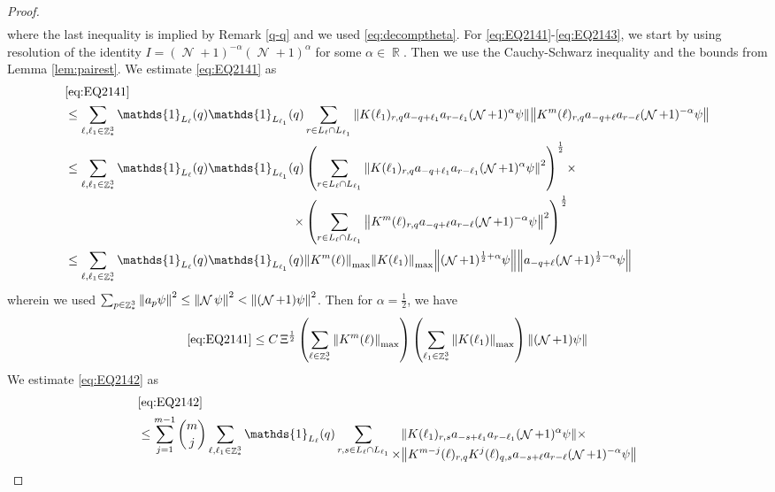 \documentclass[sn-mathphys, Numbered ,a4paper]{sn-jnl}%
\DeclareMathOperator{\R}{\mathbb{R}}
\DeclareMathOperator{\Z}{\mathbb{Z}}
\DeclareMathOperator{\NN}{\mathcal{N}}
\newcommand{\half}{\frac{1}{2}}
\theoremstyle{plain}
\theoremstyle{definition}
\theoremstyle{remark}
\theoremstyle{plain}
\theoremstyle{definition}
\theoremstyle{remark}
\begin{document}
{\begin{proof}
\begin{align}
	\end{align}
	where the last inequality is implied by Remark \ref{q-q} and we used \eqref{eq:decomptheta}.
	For \eqref{eq:EQ2141}-\eqref{eq:EQ2143}, we start by using resolution of the identity $I = (\NN+1)^{-\alpha}(\NN+1)^{\alpha}$ for some $\alpha \in \R$. Then we use the Cauchy-Schwarz inequality and the bounds from Lemma \ref{lem:pairest}.
	We estimate \eqref{eq:EQ2141} as 
	\begin{align}
		&\eqref{eq:EQ2141}\nonumber\\
		&\leq \sum\limits_{\ell, \ell_1\in \Z^3_*} \mathds{1}_{L_{\ell}}(q) \mathds{1}_{L_{\ell_1}}(q) \sum\limits_{r\in L_{\ell} \cap L_{\ell_1}} \norm{ K(\ell_1)_{r,q} a_{-q+\ell_1} a_{r-\ell_1}(\NN+1)^{\alpha}\psi}\norm{ K^m(\ell)_{r,q} a_{-q+\ell}a_{r-\ell} (\NN+1)^{-\alpha} \psi }\nonumber\\
		&\leq \sum\limits_{\ell, \ell_1\in \Z^3_*} \mathds{1}_{L_{\ell}}(q) \begin{aligned}[t] \mathds{1}_{L_{\ell_1}}(q) &\left(\sum\limits_{r\in L_{\ell} \cap L_{\ell_1}} \norm{ K(\ell_1)_{r,q} a_{-q+\ell_1} a_{r-\ell_1}(\NN+1)^{\alpha}\psi}^2\right)^\half \times \nonumber\\ \times &\left(\sum\limits_{r\in L_{\ell} \cap L_{\ell_1}} \norm{ K^m(\ell)_{r,q} a_{-q+\ell}a_{r-\ell} (\NN+1)^{-\alpha} \psi }^2\right)^\half \end{aligned}\nonumber\\
		&\leq \sum\limits_{\ell, \ell_1\in \Z^3_*} \mathds{1}_{L_{\ell}}(q) \mathds{1}_{L_{\ell_1}}(q)  \norm{K^m(\ell)}_{\mathrm{max}} \norm{ K(\ell_1)}_{\mathrm{max}} \norm{ (\NN+1)^{\half+\alpha} \psi} \norm{  a_{-q+\ell} (\NN+1)^{\half-\alpha} \psi }\nonumber
	\end{align} 
	wherein we used $\sum_{p\in \Z^3_*}\norm{a_p \psi}^2\leq\norm{\NN\psi}^2<\norm{(\NN+1)\psi}^2$. Then for $\alpha =  \half $, we have 
	\begin{equation}
		\eqref{eq:EQ2141}\leq C\, \Xi^\half \left(\sum\limits_{\ell\in \Z^3_*} \norm{K^m(\ell)}_{\mathrm{max}}\right)\left(  \sum\limits_{ \ell_1\in \Z^3_*}  \norm{ K(\ell_1)}_{\mathrm{max}} \right) \norm{ (\NN+1) \psi}\label{eq:estEQ2141} 
	\end{equation}  
	We estimate \eqref{eq:EQ2142} as
	\begin{align}
		&\eqref{eq:EQ2142}\nonumber\\
		&\leq \sum\limits_{j=1}^{m-1} {{m}\choose j} \sum\limits_{\ell, \ell_1\in \Z^3_*}\mathds{1}_{L_{\ell}}(q) \sum\limits_{r,s \in L_{\ell} \cap L_{\ell_1}} \begin{aligned}[t] &\norm{ K(\ell_1)_{r,s}a_{-s+\ell_1} a_{r-\ell_1} (\NN+1)^{\alpha}\psi}\nonumber \times \\ \times&\norm{ K^{m-j}(\ell)_{r,q} K^{j}(\ell)_{q,s} a_{-s+\ell}a_{r-\ell} (\NN+1)^{-\alpha} \psi }\end{aligned} \nonumber\\

\end{align}
\end{proof}}
\end{document}

